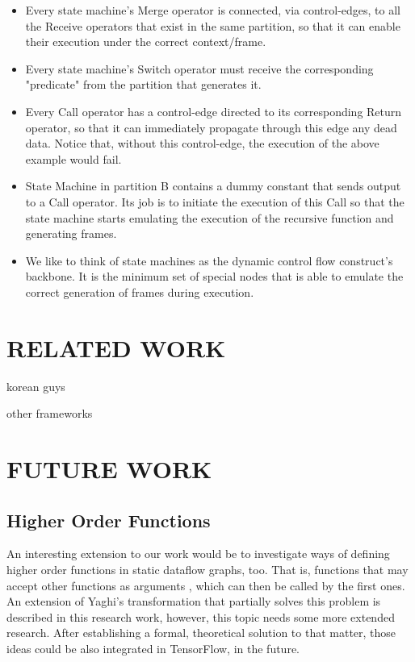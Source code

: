 \documentclass[ack,preface]{dithesis}
\begin{document}
\begin{itemize}
    \item Every state machine's Merge operator is connected, via control-edges, to all the Receive operators that exist in the same partition, so that it can enable their execution under the correct context/frame.
    \item Every state machine's Switch operator must receive the corresponding "predicate" from the partition that generates it.
    \item Every Call operator has a control-edge directed to its corresponding Return operator, so that it can immediately propagate through this edge any dead data. Notice that, without this control-edge, the execution of the above example would fail.
    \item State Machine in partition B contains a dummy constant that sends output to a Call operator. Its job is to initiate the execution of this Call so that the state machine starts emulating the execution of the recursive function and generating frames.
    \item We like to think of  state machines as the dynamic control flow construct's backbone. It is the minimum set of special nodes that  is able to emulate the correct generation of frames during execution.
    \end{itemize}



\chapter{RELATED WORK}
 \cite{Jeong:2018}

korean guys

other frameworks

\chapter{FUTURE WORK}

   \section{Higher Order Functions}

An interesting extension to our work would be to investigate ways of defining higher order functions in static dataflow graphs, too. That is, functions that may accept other functions as arguments , which can then be called by the first ones. An extension of Yaghi's transformation that partially solves this problem is described in this  \cite{RondogiannisW99} research work, however, this topic needs some more extended research. After establishing a formal, theoretical solution to that matter, those ideas could be also integrated in TensorFlow, in the future.
\end{document}
